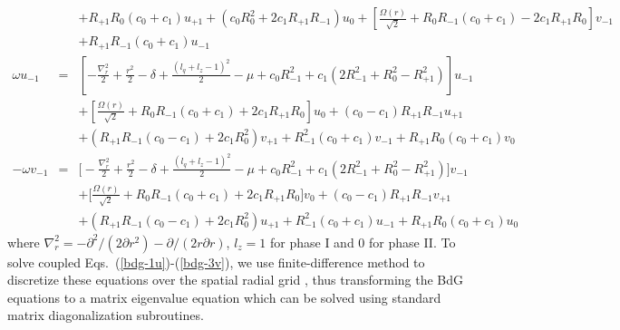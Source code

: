 \documentclass[pra,twocolumn,aps,superscriptaddress,showpacs,longbibliography]{revtex4-1}
\begin{document}
\begin{widetext}
\begin{subequations}
\begin{eqnarray}
  && + R_{+1}R_0(c_0+c_1)u_{+1}+(c_0R_0^2+2c_1R_{+1}R_{-1})u_{0}+\left[\frac{\Omega(r)}{\sqrt{2}}+R_0R_{-1}(c_0+c_1)-2c_1R_{+1}R_0 \right]v_{-1}  \nonumber \\ && + R_{+1}R_{-1}(c_0+c_1)u_{-1}\label{bdg-2v} \\
\omega u_{-1}   &=&
 \left[-\frac{\nabla^2_r}{2} +\frac{r^2}{2}- \delta+ \frac{(l_q+l_z-1)^2}{2}-\mu+c_0 R_{-1}^2+ c_1(2R_{-1}^2+R_0^2-R_{+1}^2)\right]u_{-1} \nonumber \\&&+\left[\frac{\Omega(r)}{\sqrt{2}} 
+R_0R_{-1}(c_0+c_1)+2c_1R_{+1}R_0\right]u_0 + (c_0-c_1)R_{+1}R_{-1} u_{+1} \nonumber \\&& + (R_{+1}R_{-1}(c_0-c_1)+2c_1R_{0}^2)v_{+1} +R_{-1}^2(c_0+c_1)v_{-1}+ R_{+1} R_0(c_0+c_1) v_0
  \label{bdg-3u} \\
-\omega v_{-1}   &=&
 \big[-\frac{\nabla^2_r}{2} +\frac{r^2}{2}- \delta+ \frac{(l_q+l_z-1)^2}{2}-\mu+c_0 R_{-1}^2+ c_1(2R_{-1}^2+R_0^2-R_{+1}^2)\big]v_{-1} \nonumber\\&& 
+\big[\frac{\Omega(r)}{\sqrt{2}} 
 +R_0R_{-1}(c_0+c_1)+ 2c_1R_{+1}R_0\big]v_{0} + (c_0-c_1)R_{+1}R_{-1} v_{+1}\nonumber\\&&
 + (R_{+1}R_{-1}(c_0-c_1)+2c_1R_0^2)u_{+1} +R_{-1}^2(c_0+c_1)u_{-1}+ R_{+1} R_0(c_0+c_1) u_0
  \label{bdg-3v} 
 \end{eqnarray}
\end{subequations}
where $\nabla^2_r = -\partial^2/(2\partial r^2)-{\partial}/(2 r\partial r)$, $l_z = 1$ for phase I and $0$ for phase II. 
To solve coupled Eqs.~(\ref{bdg-1u})-(\ref{bdg-3v}), we use
finite-difference method to discretize these equations over the spatial radial grid \cite{GAO2020109058}, thus transforming the
BdG equations to a matrix eigenvalue equation which can be solved using standard matrix diagonalization subroutines.

\end{widetext}
{}

\end{document}
